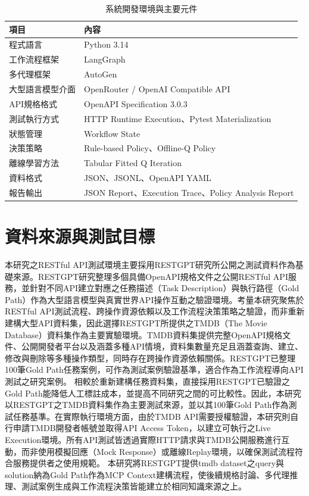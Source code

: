 \begin{ZhChapter}
\begin{table}[H]
\centering
\caption{系統開發環境與主要元件}
\label{tab:implementation_environment}
\renewcommand{\arraystretch}{1.3}
\begin{tabular}{p{4cm} p{8cm}}
\toprule
\textbf{項目} & \textbf{內容} \\
\midrule
程式語言 & Python 3.14 \\
工作流程框架 & LangGraph \\
多代理框架 & AutoGen \\
大型語言模型介面 & OpenRouter / OpenAI Compatible API \\
API規格格式 & OpenAPI Specification 3.0.3 \\
測試執行方式 & HTTP Runtime Execution、Pytest Materialization \\
狀態管理 & Workflow State \\
決策策略 & Rule-based Policy、Offline-Q Policy \\
離線學習方法 & Tabular Fitted Q Iteration \\
資料格式 & JSON、JSONL、OpenAPI YAML \\
報告輸出 & JSON Report、Execution Trace、Policy Analysis Report \\
\bottomrule
\end{tabular}
\end{table}

\section{資料來源與測試目標}
\text 本研究之RESTful API測試環境主要採用RESTGPT研究所公開之測試資料作為基礎來源\parencite{Song2023RestGPT}。RESTGPT研究整理多個具備OpenAPI規格文件之公開RESTful API服務，並針對不同API建立對應之任務描述（Task Description）與執行路徑（Gold Path）作為大型語言模型與真實世界API操作互動之驗證環境。考量本研究聚焦於RESTful API測試流程、跨操作資源依賴以及工作流程決策策略之驗證，而非重新建構大型API資料集，因此選擇RESTGPT所提供之TMDB（The Movie Database）資料集作為主要實驗環境。TMDB資料集提供完整OpenAPI規格文件、公開開發者平台以及涵蓋多種API情境，資料集數量充足且涵蓋查詢、建立、修改與刪除等多種操作類型，同時存在跨操作資源依賴關係。RESTGPT已整理100筆Gold Path任務案例，可作為測試案例驗證基準，適合作為工作流程導向API測試之研究案例。
\text 相較於重新建構任務資料集，直接採用RESTGPT已驗證之Gold Path能降低人工標註成本，並提高不同研究之間的可比較性。因此，本研究以RESTGPT之TMDB資料集作為主要測試來源，並以其100筆Gold Path作為測試任務基準。在實際執行環境方面，由於TMDB API需要授權驗證，本研究則自行申請TMDB開發者帳號並取得API Access Token，以建立可執行之Live Execution環境。所有API測試皆透過實際HTTP請求與TMDB公開服務進行互動，而非使用模擬回應（Mock Response）或離線Replay環境，以確保測試流程符合服務提供者之使用規範。
\text 本研究將RESTGPT提供tmdb dataset之query與solution納為Gold Path作為MCP Context建構流程，使後續規格討論、多代理推理、測試案例生成與工作流程決策皆能建立於相同知識來源之上。


\end{ZhChapter}
